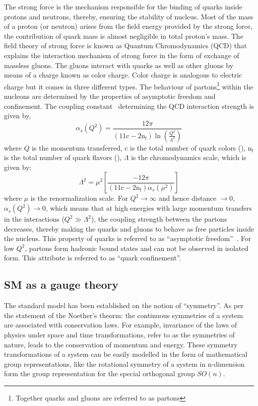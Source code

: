 The strong force is the mechanism responsible for the binding of quarks inside protons and neutrons, thereby, ensuring the stability of nucleus.
Most of the mass of a proton (or neutron) arises from the field energy provided by the strong force, the contribution of quark mass is almost negligible
in total proton's mass.
The field theory of strong force is known as Quantum Chromodynamics (QCD) that explains the interaction mechanism of strong force in the form of exchange of massless
gluons. The gluons interact with quarks as well as other gluons by means of a charge known as color charge. Color charge is analogous to electric charge 
but it comes in three different types. 
The behaviour of partons\footnote{Together quarks and gluons are referred to as partons} within the nucleons are determined by the properties of asymptotic
freedom and confinement. The coupling constant~\cite{Kluth:2006vf} determining the QCD interaction strength is given by,
\begin{equation}
\alpha_{s}(Q^{2})= \frac{12\pi}{(11\textrm{c}-2\textrm{n}_{\textrm{f}})\ln\left(\frac{Q^{2}}{\Lambda^{2}}\right)}
\label{eg:alpha_s}
\end{equation}
where $Q$ is the momentum transferred, c is the total number of quark colors (), n$_{\textrm{f}}$ is the total number of quark flavors (),
$\Lambda$ is the chromodynamics scale, which is given by:
\begin{equation}
\Lambda^{2}  = \mu^{2} \left[  \frac{-12\pi}{(11\textrm{c}-2\textrm{n}_{\textrm{f}}) \alpha_{s}(\mu^{2})  } \right]
\end{equation}
where $\mu$ is the renormalization scale. For $Q^{2}\to\infty$ and hence distance $\to0$, $\alpha_{s}(Q^{2})\to0$, which means that at high
energies with large momentum transfers in the interactions ($Q^{2}\gg\Lambda^{2}$), the coupling strength between the partons decreases, thereby making
the quarks and gluons to behave as free particles inside the nucleus. This property of quarks is referred to as
``asymptotic freedom''~\cite{Gross:1973ju,Gross:1974cs,Politzer:1974fr}.
For low $Q^{2}$, partons form hadronic bound states and can not be observed in isolated form. This attribute is referred to as ``quark confinement''. 


\subsection{SM as a gauge theory}
The standard model has been established on the notion of ``symmetry''. As per the statement of the Noether's theorm: the continuous symmetries of a system are
associated with conservation laws. For example, invariance of the laws of physics under space and time transformations, refer to as the symmetries of nature,
leads to the conservation of momentum and energy. These symmetry transformations of a system can be easily modelled in the form of
mathematical group representations, like the rotational symmetry of a system in n-dimension form the group representation for the special orthogonal group $SO (n)$.

